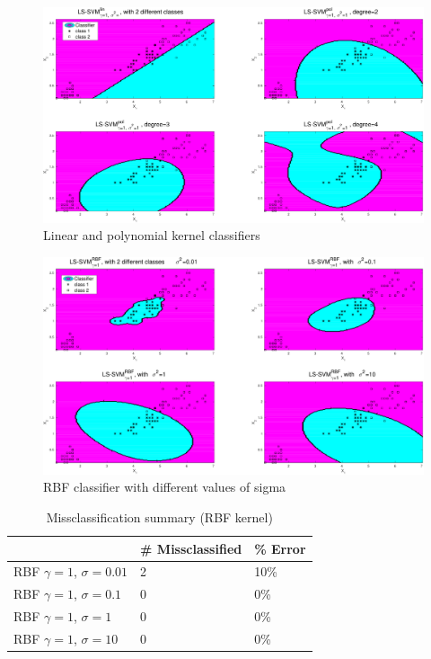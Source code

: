 \documentclass[11pt, a4paper]{article}
\begin{document}
\begin{figure}[H]
    \centering
    \includegraphics[scale=.40]{iris_linpol.pdf}
    \caption{Linear and polynomial kernel classifiers}
    \label{fig:iris_linpol}
\end{figure}


\begin{figure}[H]
    \centering
    \includegraphics[scale=.40]{iris_rbf.pdf}
    \caption{RBF classifier with different values of sigma}
    \label{fig:iris_linpol}
\end{figure}

\begin{table}[]
  \centering
  \begin{tabular}{l|l|l|}
    \cline{2-3}
    & \# Missclassified & \% Error \\ \hline
    \multicolumn{1}{|l|}{RBF $\gamma=1$, $\sigma=0.01$} & 2                 & 10\%     \\ \hline
    \multicolumn{1}{|l|}{RBF $\gamma=1$, $\sigma=0.1$}  & 0                 & 0\%      \\ \hline
    \multicolumn{1}{|l|}{RBF $\gamma=1$, $\sigma=1$}    & 0                 & 0\%      \\ \hline
    \multicolumn{1}{|l|}{RBF $\gamma=1$, $\sigma=10$}   & 0                 & 0\%      \\ \hline
  \end{tabular}
  \label{table:iris_rbf}
  \caption{Missclassification summary (RBF kernel)}
\end{table}
\end{document}

